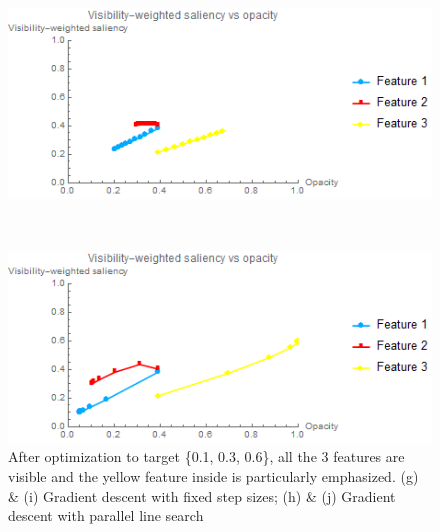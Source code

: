 \begin{figure}
	\begin{minipage}{.49\textwidth}
		\includegraphics[width=1\linewidth]{images/tooth_naive_saliencyopacity_fixed}
		\subcaption{}
	\end{minipage}~
	\begin{minipage}{.49\textwidth}
		\includegraphics[width=1\linewidth]{images/tooth_naive_saliencyopacity_parallelsearch}
		\subcaption{}
	\end{minipage}
	\caption[After optimization to target \{0.1, 0.3, 0.6\}, all the 3 features are visible and the yellow feature inside is particularly emphasized.]{After optimization to target \{0.1, 0.3, 0.6\}, all the 3 features are visible and the yellow feature inside is particularly emphasized. (g) \& (i) Gradient descent with fixed step sizes; (h) \& (j) Gradient descent with parallel line search}
	\label{fig:tooth_naive_optimized}
\end{figure}

